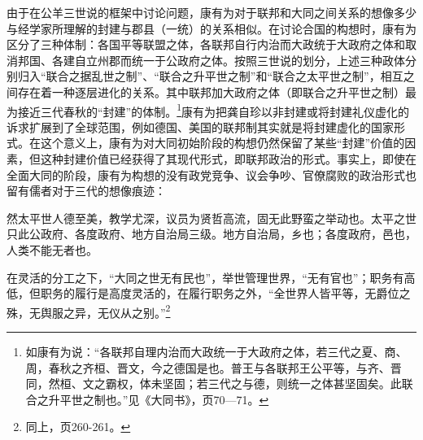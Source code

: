 \documentclass[a4paper, 12pt, openright]{ctexbook}
\renewenvironment{quote}
  {\list{}{\rightmargin2\ccwd \leftmargin2\ccwd \itemindent=2\ccwd \listparindent=2\ccwd}%
   \item\relax\small\kaishu\color{black}}
  {\endlist}
\begin{document}
由于在公羊三世说的框架中讨论问题，康有为对于联邦和大同之间关系的想像多少与经学家所理解的封建与郡县（一统）的关系相似。在讨论合国的构想时，康有为区分了三种体制：各国平等联盟之体，各联邦自行内治而大政统于大政府之体和取消邦国、各建自立州郡而统一于公政府之体。按照三世说的划分，上述三种政体分别归入“联合之据乱世之制”、“联合之升平世之制”和“联合之太平世之制”，相互之间存在着一种逐层进化的关系。其中联邦加大政府之体（即联合之升平世之制）最为接近三代春秋的“封建”的体制。\footnote{如康有为说：“各联邦自理内治而大政统一于大政府之体，若三代之夏、商、周，春秋之齐桓、晋文，今之德国是也。普王与各联邦王公平等，与齐、晋同，然桓、文之霸权，体未坚固；若三代之与德，则统一之体甚坚固矣。此联合之升平世之制也。”见《大同书》，页70—71。}康有为把龚自珍以非封建或将封建礼仪虚化的诉求扩展到了全球范围，例如德国、美国的联邦制其实就是将封建虚化的国家形式。在这个意义上，康有为对大同初始阶段的构想仍然保留了某些“封建”价值的因素，但这种封建价值已经获得了其现代形式，即联邦政治的形式。事实上，即使在全面大同的阶段，康有为构想的没有政党竞争、议会争吵、官僚腐败的政治形式也留有儒者对于三代的想像痕迹：

\begin{quote}
然太平世人德至美，教学尤深，议员为贤哲高流，固无此野蛮之举动也。太平之世只此公政府、各度政府、地方自治局三级。地方自治局，乡也；各度政府，邑也，人类不能无者也。
\end{quote}

在灵活的分工之下，“大同之世无有民也”，举世管理世界，“无有官也”；职务有高低，但职务的履行是高度灵活的，在履行职务之外，“全世界人皆平等，无爵位之殊，无舆服之异，无仪从之别。”\footnote{同上，页260-261。}
\end{document}
